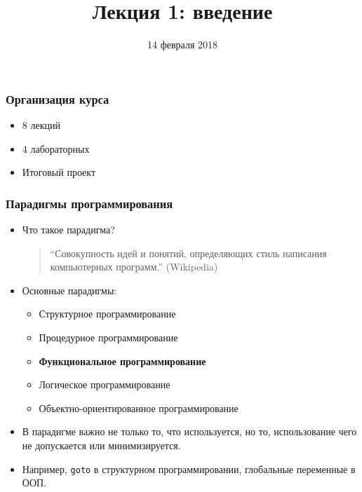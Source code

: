 \documentclass[10pt]{beamer}
\title{Лекция 1: введение}
\date{14 февраля 2018}
\begin{document}
\begin{frame}[plain]
\maketitle
\end{frame}

\begin{frame}
\frametitle{Организация курса}
\begin{itemize}
    \item 8 лекций
    \item 4 лабораторных
    \item Итоговый проект
\end{itemize}
\end{frame}

\begin{frame}
\frametitle{Парадигмы программирования}
\begin{itemize}
\item Что такое парадигма?
\pause
\begin{quote}
\enquote{Совокупность идей и понятий, определяющих стиль написания компьютерных программ.} (Wikipedia)
\end{quote}
\pause
\item Основные парадигмы:
\pause
\begin{itemize}
    \item Структурное программирование
    \item Процедурное программирование
    \item \textbf{Функциональное программирование}
    \item Логическое программирование
    \item Объектно-ориентированное программирование
\end{itemize}
\pause
\item В парадигме важно не только то, что используется, но то, использование чего не допускается или минимизируется.
\pause
\item Например, \lstinline!goto! в структурном программировании, глобальные переменные в ООП.
\end{itemize}
\end{frame}
\end{document}
